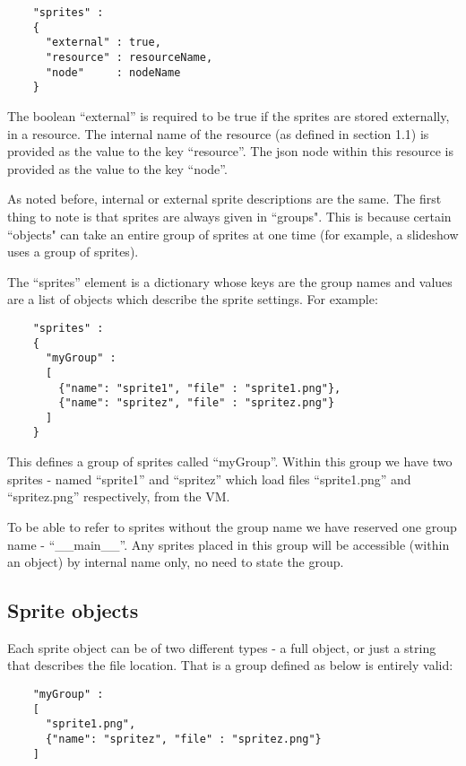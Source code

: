 \documentclass[a4paper]{article}
\begin{document}
  \begin{verbatim}
    "sprites" :
    {
      "external" : true,
      "resource" : resourceName,
      "node"     : nodeName
    }
  \end{verbatim}

  The boolean ``external'' is required to be true if the sprites are stored
  externally, in a resource. The internal name of the resource (as defined 
  in section 1.1) is provided as the value to the key ``resource''. The json
  node within this resource is provided as the value to the key ``node''.

  As noted before, internal or external sprite descriptions are the same.
  The first thing to note is that sprites are always given in ``groups".
  This is because certain ``objects" can take an entire group of sprites at
  one time (for example, a slideshow uses a group of sprites).

  The ``sprites'' element is a dictionary whose keys are the group names and
  values are a list of objects which describe the sprite settings. For
  example:

  \begin{verbatim}
    "sprites" :
    {
      "myGroup" : 
      [
        {"name": "sprite1", "file" : "sprite1.png"},
        {"name": "spritez", "file" : "spritez.png"}
      ]
    }
  \end{verbatim}

  This defines a group of sprites called ``myGroup''. Within this group we
  have two sprites - named ``sprite1'' and ``spritez'' which load files
  ``sprite1.png'' and ``spritez.png'' respectively, from the VM.

  To be able to refer to sprites without the group name we have reserved one
  group name - ``\_\_main\_\_''. Any sprites placed in this group will be
  accessible (within an object) by internal name only, no need to state the 
  group.

  \subsection{Sprite objects}
  Each sprite object can be of two different types - a full object, or just
  a string that describes the file location. That is a group defined as
  below is entirely valid:

  \begin{verbatim}
    "myGroup" : 
    [
      "sprite1.png",
      {"name": "spritez", "file" : "spritez.png"}
    ]
  \end{verbatim}
\end{document}
